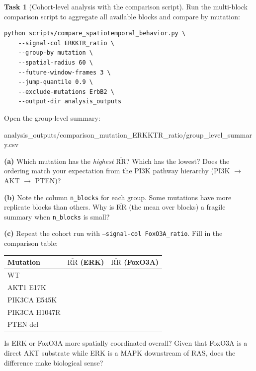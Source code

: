 \documentclass[11pt,a4paper]{article}
\theoremstyle{definition}
\newtheorem{task}{Task}
\newcommand{\RR}{\mathrm{RR}}
\newcommand{\1}[1]{\mathbf{1}\!\left[#1\right]}
\newcommand{\param}[1]{\texttt{#1}}
\newcommand{\filepath}[1]{%
  \par\smallskip
  \begin{center}%
    \colorbox{pathbg}{\small\ttfamily\strut\enspace #1\enspace}%
  \end{center}%
  \smallskip\noindent
}
\begin{document}
\begin{task}[Cohort-level analysis with the comparison script]\label{task:cohort}
Run the multi-block comparison script to aggregate all available
blocks and compare by mutation:

\begin{framed}
\begin{verbatim}
python scripts/compare_spatiotemporal_behavior.py \
    --signal-col ERKKTR_ratio \
    --group-by mutation \
    --spatial-radius 60 \
    --future-window-frames 3 \
    --jump-quantile 0.9 \
    --exclude-mutations ErbB2 \
    --output-dir analysis_outputs
\end{verbatim}
\end{framed}

Open the group-level summary:
\filepath{analysis\_outputs/comparison\_mutation\_ERKKTR\_ratio/group\_level\_summary.csv}

\medskip
\noindent\textbf{(a)} Which mutation has the \emph{highest} $\overline{\RR}$?
Which has the lowest?
Does the ordering match your expectation from the PI3K pathway hierarchy
(PI3K $\to$ AKT $\to$ PTEN)?



\noindent\textbf{(b)} Note the column \param{n\_blocks} for each group.
Some mutations have more replicate blocks than others.
Why is $\overline{\RR}$ (the mean over blocks) a fragile summary when
\param{n\_blocks} is small?



\noindent\textbf{(c)} Repeat the cohort run with \param{--signal-col FoxO3A\_ratio}.
Fill in the comparison table:

\begin{center}
\renewcommand{\arraystretch}{1.4}
\begin{tabular}{lcc}
\toprule
Mutation & $\overline{\RR}$ (ERK) & $\overline{\RR}$ (FoxO3A) \\
\midrule
WT           & & \\
AKT1 E17K    & & \\
PIK3CA E545K & & \\
PIK3CA H1047R& & \\
PTEN del     & & \\
\bottomrule
\end{tabular}
\end{center}

Is ERK or FoxO3A more spatially coordinated overall?
Given that FoxO3A is a direct AKT substrate while ERK is a MAPK downstream of
RAS, does the difference make biological sense?


\end{task}
\end{document}
